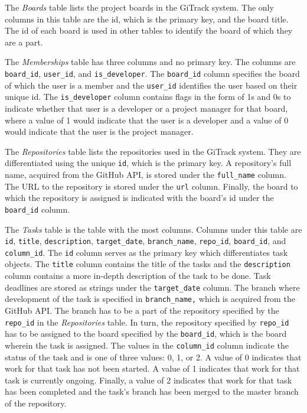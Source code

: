 \documentclass{article}
\def\code#1{\texttt{#1}}
\begin{document}
The \emph{Boards} table lists the project boards in the GiTrack system. The only
columns in this table are the id, which is the primary key, and the board title.
The id of each board is used in other tables to identify the board of which they
are a part.

The \emph{Memberships} table has three columns and no primary key. The columns
are \code{board\_id}, \code{user\_id}, and \code{is\_developer}. The
\code{board\_id} column specifies the board of which the user is a member and
the \code{user\_id} identifies the user based on their unique id. The
\code{is\_developer} column contains flags in the form of 1s and 0s to indicate
whether that user is a developer or a project manager for that board, where a
value of 1 would indicate that the user is a developer and a value of 0 would
indicate that the user is the project manager.

The \emph{Repositories} table lists the repositories used in the GiTrack system.
They are differentiated using the unique \code{id}, which is the primary key. A
repository’s full name, acquired from the GitHub API, is stored under the
\code{full\_name} column. The URL to the repository is stored under the
\code{url} column. Finally, the board to which the repository is assigned is
indicated with the board’s id under the \code{board\_id} column.

The \emph{Tasks} table is the table with the most columns. Columns under this
table are \code{id}, \code{title}, \code{description}, \code{target\_date},
\code{branch\_name}, \code{repo\_id}, \code{board\_id}, and \code{column\_id}.
The \code{id} column serves as the primary key which differentiates task
objects. The \code{title} column contains the title of the tasks and the
\code{description} column contains a more in-depth description of the task to be
done. Task deadlines are stored as strings under the \code{target\_date} column.
The branch where development of the task is specified in \code{branch\_name,}
which is acquired from the GitHub API. The branch has to be a part of the
repository specified by the \code{repo\_id} in the \emph{Repositories} table. In
turn, the repository specified by \code{repo\_id} has to be assigned to the
board specified by the \code{board\_id}, which is the board wherein the task is
assigned. The values in the \code{column\_id} column indicate the status of the
task and is one of three values: 0, 1, or 2. A value of 0 indicates that work
for that task has not been started. A value of 1 indicates that work for that
task is currently ongoing. Finally, a value of 2 indicates that work for that
task has been completed and the task’s branch has been merged to the master
branch of the repository.
\end{document}
